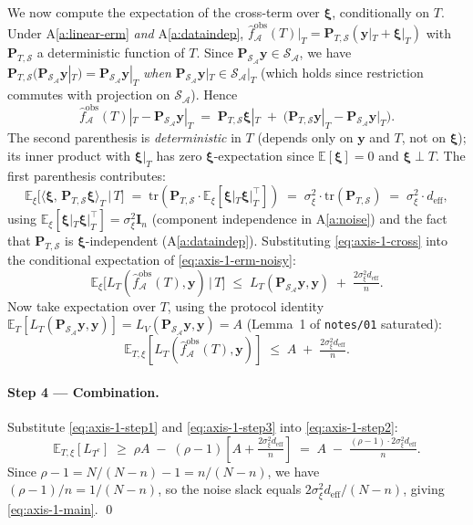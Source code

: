 \documentclass[11pt,a4paper]{article}
\theoremstyle{plain}
\theoremstyle{definition}
\theoremstyle{remark}
\newcommand{\by}{\mathbf{y}}
\newcommand{\bxi}{\boldsymbol{\xi}}
\newcommand{\bP}{\mathbf{P}}
\newcommand{\bI}{\mathbf{I}}
\newcommand{\E}{\mathbb{E}}
\newcommand{\Scal}{\mathcal{S}}
\newcommand{\Acal}{\mathcal{A}}
\newcommand{\tr}{\mathrm{tr}}
\begin{document}
We now compute the expectation of the cross-term over $\bxi$,
conditionally on $T$. Under A\ref{a:linear-erm} \emph{and}
A\ref{a:dataindep},
$\hat f^{\mathrm{obs}}_\Acal(T)|_T = \bP_{T,\Scal}(\by|_T + \bxi|_T)$
with $\bP_{T,\Scal}$ a deterministic function of $T$.
Since $\bP_{\Scal_\Acal}\by \in \Scal_\Acal$, we have
$\bP_{T,\Scal}(\bP_{\Scal_\Acal}\by|_T) = \bP_{\Scal_\Acal}\by|_T$
\emph{when} $\bP_{\Scal_\Acal}\by|_T \in \Scal_\Acal|_T$ (which
holds since restriction commutes with projection on $\Scal_\Acal$).
Hence
\begin{equation}
    \hat f^{\mathrm{obs}}_\Acal(T)|_T - \bP_{\Scal_\Acal}\by|_T
    \;=\; \bP_{T,\Scal}\bxi|_T \;+\; \big(\bP_{T,\Scal}\by|_T - \bP_{\Scal_\Acal}\by|_T\big).
    \label{eq:axis-1-decomp}
\end{equation}
The second parenthesis is \emph{deterministic} in $T$ (depends only
on $\by$ and $T$, not on $\bxi$); its inner product with
$\bxi|_T$ has zero $\bxi$-expectation since $\E[\bxi] = 0$ and
$\bxi \perp T$. The first parenthesis contributes:
\begin{equation}
    \E_\xi\!\big[\langle \bxi,\, \bP_{T,\Scal}\bxi\rangle_T \,|\, T\big]
    \;=\; \tr(\bP_{T,\Scal} \cdot \E_\xi[\bxi|_T \bxi|_T^\top])
    \;=\; \sigma_\xi^2 \cdot \tr(\bP_{T,\Scal})
    \;=\; \sigma_\xi^2 \cdot d_{\mathrm{eff}},
    \label{eq:axis-1-cross}
\end{equation}
using $\E_\xi[\bxi|_T \bxi|_T^\top] = \sigma_\xi^2 \bI_n$ (component
independence in A\ref{a:noise}) and the fact that $\bP_{T,\Scal}$ is
$\bxi$-independent (A\ref{a:dataindep}). Substituting
\eqref{eq:axis-1-cross} into the conditional expectation of
\eqref{eq:axis-1-erm-noisy}:
\begin{equation}
    \E_\xi\!\big[L_T(\hat f^{\mathrm{obs}}_\Acal(T), \by) \,|\, T\big]
    \;\le\; L_T(\bP_{\Scal_\Acal}\by, \by) \;+\; \tfrac{2 \sigma_\xi^2 d_{\mathrm{eff}}}{n}.
    \label{eq:axis-1-condit}
\end{equation}
Now take expectation over $T$, using the protocol identity
$\E_T[L_T(\bP_{\Scal_\Acal}\by, \by)] = L_V(\bP_{\Scal_\Acal}\by, \by)
= A$ (Lemma~1 of \texttt{notes/01} saturated):
\begin{equation}
    \E_{T,\xi}[L_T(\hat f^{\mathrm{obs}}_\Acal(T), \by)]
    \;\le\; A \;+\; \tfrac{2 \sigma_\xi^2 d_{\mathrm{eff}}}{n}.
    \label{eq:axis-1-step3}
\end{equation}

\paragraph{Step 4 --- Combination.}
Substitute \eqref{eq:axis-1-step1} and \eqref{eq:axis-1-step3} into
\eqref{eq:axis-1-step2}:
\begin{equation*}
    \E_{T,\xi}[L_{T^c}]
    \;\ge\; \rho A \;-\; (\rho - 1)\!\left[A + \tfrac{2\sigma_\xi^2 d_{\mathrm{eff}}}{n}\right]
    \;=\; A \;-\; \tfrac{(\rho - 1) \cdot 2 \sigma_\xi^2 d_{\mathrm{eff}}}{n}.
\end{equation*}
Since $\rho - 1 = N/(N-n) - 1 = n/(N-n)$, we have
$(\rho - 1)/n = 1/(N-n)$, so the noise slack equals
$2 \sigma_\xi^2 d_{\mathrm{eff}}/(N-n)$, giving
\eqref{eq:axis-1-main}. \qed
\end{document}
